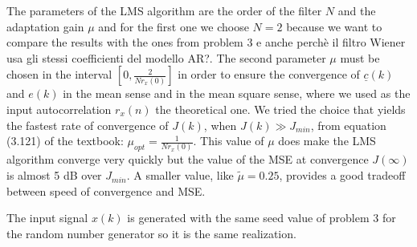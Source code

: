 \documentclass{article}
\renewcommand{\vec}[1]{
  \underline{#1}
}
\newcommand{\E}[1]{
  \operatorname{E}\left[ #1 \right]
}
\newcommand{\norm}[1]{
  \left \lVert #1 \right \rVert
}
\newcommand{\abs}[1]{
  \left| #1 \right|
}
\begin{document}
The parameters of the LMS algorithm are the order of the filter $N$
and the adaptation gain $\mu$ and for the first one we choose $N = 2$
because we want to compare the results with the ones from problem 3
{\color{red} e anche perchè il filtro Wiener usa gli stessi
  coefficienti del modello AR?}.  The second parameter $\mu$ must be
chosen in the interval $\left[0,\frac{2}{Nr_x(0)}\right]$ in order to
ensure the convergence of $\vec{c}(k)$ and $e(k)$ in the mean sense
and in the mean square sense,
where we used as the input autocorrelation $r_x(n)$ {\color{red} the
  theoretical one}.  We tried the choice that yields the fastest rate
of convergence of $J(k)$, when $J(k) \gg J_{min}$, from equation
(3.121) of the textbook: $\mu_{opt} = \frac{1}{Nr_x(0)}$. This value
of $\mu$ does make the LMS algorithm converge very quickly but the
value of the MSE at convergence $J(\infty)$ is {\color{red} almost 5
  dB} over $J_{min}$. A smaller value, like $\tilde{\mu} = 0.25$,
  provides a good tradeoff between speed of convergence and MSE.

  The input signal $x(k)$ is generated with the same seed value of
  problem 3 for the random number generator so it is the same
  realization.
\end{document}
